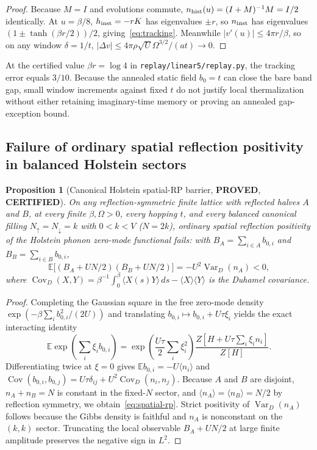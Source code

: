\documentclass[11pt]{article}
\newtheorem{proposition}{Proposition}
\theoremstyle{remark}
\DeclareMathOperator{\Var}{Var}
\DeclareMathOperator{\Cov}{Cov}
\newcommand{\proved}{\textbf{PROVED}}
\newcommand{\certified}{\textbf{CERTIFIED}}
\begin{document}
\begin{proof}
Because $M=I$ and evolutions commute, $n_{\rm hist}(u)=(I+M)^{-1}M=I/2$ identically. At $u=\beta/8$, $h_{\rm inst}=-rK$ has eigenvalues $\pm r$, so $n_{\rm inst}$ has eigenvalues $(1\pm\tanh(\beta r/2))/2$, giving~\eqref{eq:tracking}. Meanwhile $|v'(u)|\le 4\pi r/\beta$, so on any window $\delta=1/t$, $|\Delta v|\le 4\pi\rho\sqrt{U}\Omega^{3/2}/(at)\to 0$.
\end{proof}

At the certified value $\beta r=\log 4$ in \texttt{replay/linear5/replay.py}, the tracking error equals $3/10$. Because the annealed static field $b_0=t$ can close the bare band gap, small window increments against fixed $t$ do not justify local thermalization without either retaining imaginary-time memory or proving an annealed gap-exception bound.

\subsection{Failure of ordinary spatial reflection positivity in balanced Holstein sectors}

\begin{proposition}[Canonical Holstein spatial-RP barrier, \proved, \certified]\label{prop:spatial-rp}
On any reflection-symmetric finite lattice with reflected halves $A$ and $B$, at every finite $\beta,\Omega>0$, every hopping $t$, and every balanced canonical filling $N_\uparrow=N_\downarrow=k$ with $0<k<V$ ($N=2k$), ordinary spatial reflection positivity of the Holstein phonon zero-mode functional fails: with $B_A=\sum_{i\in A}b_{0,i}$ and $B_B=\sum_{i\in B}b_{0,i}$,
\begin{equation}\label{eq:spatial-rp}
 \mathbb E\!\bigl[(B_A+UN/2)(B_B+UN/2)\bigr] = -U^2\Var_D(n_A) < 0,
\end{equation}
where $\Cov_D(X,Y)=\beta^{-1}\int_0^\beta\langle X(s)Y\rangle\,ds-\langle X\rangle\langle Y\rangle$ is the Duhamel covariance.
\end{proposition}

\begin{proof}
Completing the Gaussian square in the free zero-mode density $\exp(-\beta\sum_i b_{0,i}^2/(2U))$ and translating $b_{0,i}\mapsto b_{0,i}+U\tau\xi_i$ yields the exact interacting identity
\begin{equation}\label{eq:zero-source}
 \mathbb E\exp\!\left(\sum_i\xi_i b_{0,i}\right)=\exp\!\left(\frac{U\tau}{2}\sum_i\xi_i^2\right)
 \frac{Z\!\left[H+U\tau\sum_i\xi_i n_i\right]}{Z[H]}.
\end{equation}
Differentiating twice at $\xi=0$ gives $\mathbb E b_{0,i}=-U\langle n_i\rangle$ and $\Cov(b_{0,i},b_{0,j})=U\tau\delta_{ij}+U^2\Cov_D(n_i,n_j)$. Because $A$ and $B$ are disjoint, $n_A+n_B=N$ is constant in the fixed-$N$ sector, and $\langle n_A\rangle=\langle n_B\rangle=N/2$ by reflection symmetry, we obtain~\eqref{eq:spatial-rp}. Strict positivity of $\Var_D(n_A)$ follows because the Gibbs density is faithful and $n_A$ is nonconstant on the $(k,k)$ sector. Truncating the local observable $B_A+UN/2$ at large finite amplitude preserves the negative sign in $L^2$.
\end{proof}
\end{document}
